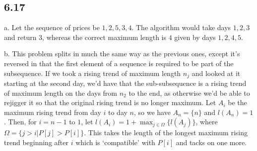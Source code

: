 \documentclass{article}
\begin{document}
\subsection*{6.17}
a. Let the sequence of prices be $1,2,5,3,4$. The algorithm would take days $1,2,3$ and return $3$, whereas the correct maximum length is $4$ given by days $1,2,4,5$.

\noindent b. This problem splits in much the same way as the previous ones, except it's reversed in that the first element of a sequence is required to be part of the subsequence. If we took a rising trend of maximum length $n_j$ and looked at it starting at the second day, we'd have that the sub-subsequence is a rising trend of maximum length on the days from $n_2$ to the end, as otherwise we'd be able to rejigger it so that the original rising trend is no longer maximum. Let $A_i$ be the maximum rising trend from day $i$ to day $n$, so we have $A_n=\{n\}$ and $l(A_n)=1$. Then, for $i=n-1$ to $1$, let $\displaystyle l(A_i)=1+\max_{j\in \Omega}\{l(A_j)\}$, where $\Omega=\{j>i|P[j]>P[i]\}$. This takes the length of the longest maximum rising trend beginning after $i$ which is `compatible' with $P[i]$ and tacks on one more.
\end{document}
